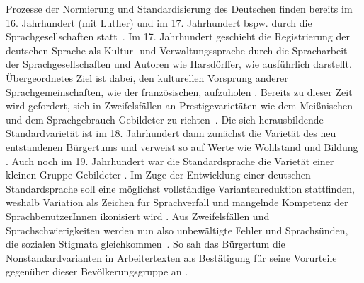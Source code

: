 Prozesse der Normierung und Standardisierung des Deutschen finden bereits im 16. Jahrhundert (mit Luther) und im 17. Jahrhundert bspw. durch die Sprachgesellschaften statt~\citep[s.][16--17, 27]{Hundt.2000}. 
Im 17. Jahrhundert geschieht die Registrierung der deutschen Sprache als Kultur- und Verwaltungssprache durch die Spracharbeit der Sprachgesellschaften und Autoren wie Harsd{\"o}rffer, wie \citet[]{Hundt.2000} ausführlich darstellt. 
Übergeordnetes Ziel ist dabei, den kulturellen Vorsprung anderer Sprachgemeinschaften, wie der französischen, aufzuholen \citep[s.][4]{Hundt.2000}. 
Bereits zu dieser Zeit wird gefordert, sich in Zweifelsf{\"a}llen an Prestigevariet{\"a}ten wie dem Mei{\ss}nischen und dem Sprachgebrauch Gebildeter zu richten~\citep[s.][43]{Hundt.2000}. 
Die sich herausbildende Standardvarietät ist im 18. Jahrhundert dann zunächst die Varietät des neu entstandenen Bürgertums und verweist so auf Werte wie Wohlstand und Bildung \citep[s.][1962--1965]{Mattheier2000}. 
Auch noch im 19. Jahrhundert war die Standardsprache die Varietät einer kleinen Gruppe Gebildeter \citep[s.][2]{Elspa2005}. 
Im Zuge der Entwicklung einer deutschen Standardsprache soll eine möglichst vollständige Variantenreduktion stattfinden, weshalb Variation als Zeichen für Sprachverfall und mangelnde Kompetenz der SprachbenutzerInnen ikonisiert wird \citep[s.][24]{Klein2003}. 
{\glqq}Aus Zweifelsf{\"a}llen und Sprachschwierigkeiten werden nun also unbew{\"a}ltigte Fehler und Sprachs{\"u}nden, die sozialen Stigmata gleichkommen{\grqq}~\citep[25]{Klein2003}. 
So sah das Bürgertum die Nonstandardvarianten in Arbeitertexten als Bestätigung für seine Vorurteile gegenüber dieser Bevölkerungsgruppe an \citep[s.][1957]{Mattheier2000}. 

